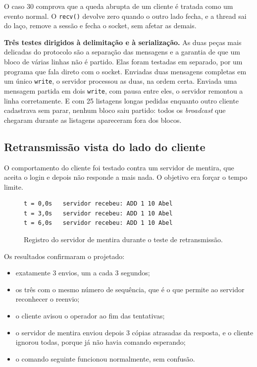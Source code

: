 \documentclass[12pt,a4paper]{article}
\begin{document}
O caso 30 comprova que a queda abrupta de um cliente é tratada como um evento
normal. O \texttt{recv()} devolve zero quando o outro lado fecha, e a thread sai
do laço, remove a sessão e fecha o socket, sem afetar as demais.

\vspace{6pt}
\noindent\textbf{Três testes dirigidos à delimitação e à serialização.} As duas
peças mais delicadas do protocolo são a separação das mensagens e a garantia de
que um bloco de várias linhas não é partido. Elas foram testadas em separado, por
um programa que fala direto com o socket. Enviadas duas mensagens completas em um
único \texttt{write}, o servidor processou as duas, na ordem certa. Enviada uma
mensagem partida em dois \texttt{write}, com pausa entre eles, o servidor
remontou a linha corretamente. E com 25 listagens longas pedidas enquanto outro
cliente cadastrava sem parar, nenhum bloco saiu partido: todos os
\textit{broadcast} que chegaram durante as listagens apareceram fora dos blocos.

\subsection{Retransmissão vista do lado do cliente}

O comportamento do cliente foi testado contra um servidor de mentira, que aceita
o login e depois não responde a mais nada. O objetivo era forçar o tempo limite.

\begin{figure}[H]
\centering
\begin{minipage}{0.75\textwidth}
\ttfamily\footnotesize
\begin{verbatim}
t = 0,0s   servidor recebeu: ADD 1 10 Abel
t = 3,0s   servidor recebeu: ADD 1 10 Abel
t = 6,0s   servidor recebeu: ADD 1 10 Abel
\end{verbatim}
\end{minipage}
\caption{Registro do servidor de mentira durante o teste de retransmissão.}
\end{figure}

Os resultados confirmaram o projetado:

\begin{itemize}
  \item exatamente 3 envios, um a cada 3 segundos;
  \item os três com o mesmo número de sequência, que é o que permite ao servidor
        reconhecer o reenvio;
  \item o cliente avisou o operador ao fim das tentativas;
  \item o servidor de mentira enviou depois 3 cópias atrasadas da resposta, e o
        cliente ignorou todas, porque já não havia comando esperando;
  \item o comando seguinte funcionou normalmente, sem confusão.
\end{itemize}
\end{document}
